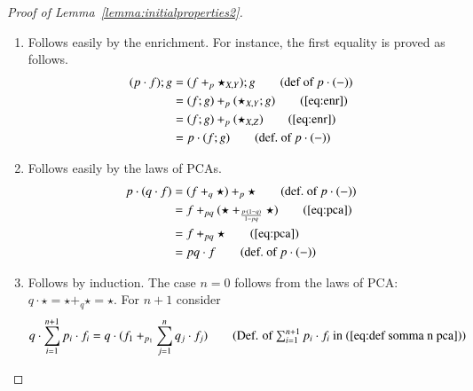 \begin{proof}[Proof of Lemma~\ref{lemma:initialproperties2}]
    \begin{enumerate}
        \item  Follows easily by the enrichment. For instance, the first equality is proved as follows.
\begin{align*} 
(p\cdot f) ; g & = (f+_p\star_{X,Y});g \tag{def of $p\cdot(-)$} \\
&= (f;g) +_p(\star_{X,Y};g) \tag{\ref{eq:enr}}\\
&= (f;g) +_p(\star_{X,Z}) \tag{\ref{eq:enr}}\\
&= p\cdot (f ; g) \tag{def.\ of $p\cdot(-)$} \\
\end{align*}
\item Follows easily by the laws of PCAs.
\begin{align*}
p\cdot (q \cdot f) &= (f+_q \star )+_p \star \tag{def.\ of $p\cdot(-)$}\\
&= f+_{pq} (\star +_{\frac{p\cdot(1-q)}{1-pq}} \star) \tag{\ref{eq:pca}} \\
&= f+_{pq} \star \tag{\ref{eq:pca}} \\
&= pq \cdot f \tag{def.\ of $p\cdot(-)$}
\end{align*}
\item Follows by induction. The case $n=0$ follows from the laws of PCA: $q\cdot \star= \star +_q \star= \star$. For $n+1$ consider 
\begin{align}
    q\cdot\sum_{i=1}^{n+1}p_i\cdot f_i &= q\cdot ( f_{1} +_{p_{1}}\sum_{j=1}^{n}q_j\cdot f_j) \tag{Def. of $\sum_{i=1}^{n+1}{p_i}\cdot f_i$ in (\ref{eq:def somma n pca})}\\

\end{align}
\end{enumerate}
\end{proof}
